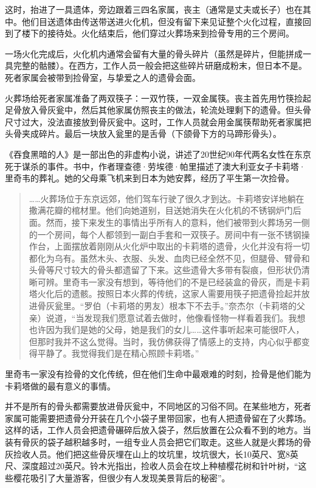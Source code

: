 \documentclass[12pt,oneside]{book}
\begin{document}
这时，抬进了一具遗体，旁边跟着三四名家属，丧主（通常是丈夫或长子）也在其中。他们目送遗体由传送带送进火化机，但没有留下来见证整个火化过程，直接回到了楼下的接待处。火化结束后，他们穿过火葬场来到捡骨专用的三个房间。

一场火化完成后，火化机内通常会留有大量的骨头碎片（虽然是碎片，但能拼成一具完整的骷髅）。在西方，工作人员一般会把这些碎片研磨成粉末，但日本不是。死者家属会被带到捡骨室，与挚爱之人的遗骨会面。

火葬场给死者家属准备了两双筷子：一双竹筷，一双金属筷。丧主首先用竹筷捡起足骨放入骨灰瓮中，然后其他家属仿照丧主的做法，轮流处理剩下的遗骨。但头骨尺寸过大，没法直接放到骨灰瓮中。这时，工作人员就会用金属筷帮助死者家属把头骨夹成碎片。最后一块放入瓮里的是舌骨（下颌骨下方的马蹄形骨头）。

《吞食黑暗的人》是一部出色的非虚构小说，讲述了20世纪90年代两名女性在东京死于谋杀的事件。书中，作者理查德·劳埃德·帕里描述了澳大利亚女子卡莉塔·里奇韦的葬礼。她的父母乘飞机来到日本为她安葬，经历了平生第一次捡骨。

\begin{quotation}
……火葬场位于东京远郊，他们驾车行驶了很久才到达。卡莉塔安详地躺在撒满花瓣的棺材里。他们向她道别，目送她消失在火化机的不锈钢炉门后面。然而，接下来发生的事情出乎所有人的意料，他们被带到火葬场另一侧的一个房间，每个人都领到一副白手套和一双筷子。房间中有一张不锈钢操作台，上面摆放着刚刚从火化炉中取出的卡莉塔的遗骨，火化并没有将一切都化为乌有。虽然木头、衣服、头发、血肉已经全然不见，但腿骨、臂骨和头骨等尺寸较大的骨头都遗留了下来。这些遗骨大多带有裂痕，但形状仍清晰可辨。里奇韦一家没有想到，等待他们的不是已经装盒的骨灰，而是卡莉塔火化后的遗骸。按照日本火葬的传统，这家人需要用筷子把遗骨捡起并放进骨灰瓮里。“罗伯（卡莉塔的男友）根本下不去手。”奈杰尔（卡莉塔的父亲）说道，“当发现我们愿意试着去做时，他像看怪物一样看着我们。我想也许因为我们是她的父母，她是我们的女儿……这件事听起来可能很吓人，但那时我并不这么觉得。当时，我仿佛获得了情感上的支持，内心似乎都变得平静了。我觉得我们是在精心照顾卡莉塔。”
\end{quotation}

里奇韦一家没有捡骨的文化传统，但在他们生命中最艰难的时刻，捡骨是他们能为卡莉塔做的最有意义的事情。

并不是所有的骨头都需要放进骨灰瓮中，不同地区的习俗不同。在某些地方，死者家属可能需要把遗骨分开装在几个小袋子里带回家，也有人把遗骨留在了火葬场。这样的话，工作人员会把遗骨碾碎后放入袋子，然后放置在公众看不到的地方。当装有骨灰的袋子越积越多时，一组专业人员会把它们取走。这些人就是火葬场的骨灰捡收人员。他们把这些骨灰埋在山上的坟坑里，坟坑很大，长10英尺、宽8英尺、深度超过20英尺。铃木光指出，捡收人员会在坟上种植樱花树和针叶树，“这些樱花吸引了大量游客，但很少有人发现美景背后的秘密”。
\end{document}
